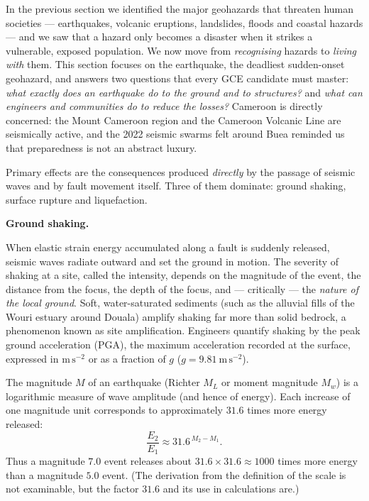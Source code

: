 \documentclass[11pt]{article}
\newcommand{\cle}[1]{{\popxbold\color{popdark}#1}}
\newcounter{popsec}
\newcounter{popsub}
\newcommand{\courssub}[1]{%
  \stepcounter{popsub}%
  \par\vspace{9pt}\noindent{\popxbold\fontsize{11.5}{13}\selectfont\color{popink}{\color{poporange}\thepopsec.\thepopsub}\hspace{6pt}#1}\par\nopagebreak\vspace{4pt}
}
\begin{document}
In the previous section we identified the major geohazards that threaten human societies — earthquakes, volcanic eruptions, landslides, floods and coastal hazards — and we saw that a \cle{hazard} only becomes a \cle{disaster} when it strikes a vulnerable, exposed population. We now move from \emph{recognising} hazards to \emph{living with} them. This section focuses on the earthquake, the deadliest sudden-onset geohazard, and answers two questions that every GCE candidate must master: \emph{what exactly does an earthquake do to the ground and to structures?} and \emph{what can engineers and communities do to reduce the losses?} Cameroon is directly concerned: the Mount Cameroon region and the Cameroon Volcanic Line are seismically active, and the 2022 seismic swarms felt around Buea reminded us that preparedness is not an abstract luxury.

\courssub{Primary Effects of Earthquakes}

Primary effects are the consequences produced \emph{directly} by the passage of seismic waves and by fault movement itself. Three of them dominate: ground shaking, surface rupture and liquefaction.

\textbf{Ground shaking.}\par
When elastic strain energy accumulated along a fault is suddenly released, seismic waves radiate outward and set the ground in motion. The severity of shaking at a site, called the \cle{intensity}, depends on the magnitude of the event, the distance from the focus, the depth of the focus, and — critically — the \emph{nature of the local ground}. Soft, water-saturated sediments (such as the alluvial fills of the Wouri estuary around Douala) amplify shaking far more than solid bedrock, a phenomenon known as \cle{site amplification}. Engineers quantify shaking by the \cle{peak ground acceleration} (PGA), the maximum acceleration recorded at the surface, expressed in $\mathrm{m\,s^{-2}}$ or as a fraction of $g$ ($g = 9.81\ \mathrm{m\,s^{-2}}$).

\begin{propriete}
The magnitude $M$ of an earthquake (Richter $M_L$ or moment magnitude $M_w$) is a logarithmic measure of wave amplitude (and hence of energy). Each increase of one magnitude unit corresponds to approximately $31.6$ times more energy released:
\[ \frac{E_2}{E_1} \approx 31.6^{\,M_2 - M_1}. \]
Thus a magnitude $7.0$ event releases about $31.6 \times 31.6 \approx 1000$ times more energy than a magnitude $5.0$ event. (The derivation from the definition of the scale is not examinable, but the factor $31.6$ and its use in calculations are.)
\end{propriete}
\end{document}
